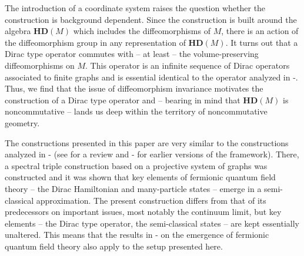 \documentclass[12pt]{article}
\begin{document}
The introduction of a coordinate system raises the question whether the construction is background dependent. 
Since the construction is built around the algebra $\mathbf{HD}(M) $ which includes the diffeomorphisms of $M$, there is an action of the diffeomorphism group in any representation of $\mathbf{HD}(M) $.
It turns out that a Dirac type operator commutes with -- at least --  the volume-preserving diffeomorphisms on $M$. This operator is an infinite sequence of Dirac operators associated to finite graphs and is essential identical to the operator analyzed in \cite{AGNP1}-\cite{AGN3}.
%
Thus, we find that the issue of diffeomorphism invariance motivates the construction of a Dirac type operator and -- bearing in mind that $\mathbf{HD}(M) $ is noncommutative -- lands us deep within the territory of noncommutative geometry.






The constructions presented in this paper are very similar to the constructions analyzed in \cite{AGNP1}-\cite{Aastrup:2011dt} (see \cite{Aastrup:2012jj} for a review and \cite{Aastrup:2005yk}-\cite{Aastrup:2009ux} for earlier versions of the framework). There, a spectral triple construction based on a projective system of graphs was constructed and it was shown that key elements of fermionic quantum field theory  -- the Dirac Hamiltonian and many-particle states -- emerge in a semi-classical approximation. 
The present construction differs from that of its predecessors on important issues, most notably the continuum limit, but key elements -- the Dirac type operator, the semi-classical states -- are kept essentially unaltered.
This means that the results in \cite{AGNP1}-\cite{AGN3} on the emergence of fermionic quantum field theory also apply to the setup presented here. 
\end{document}
